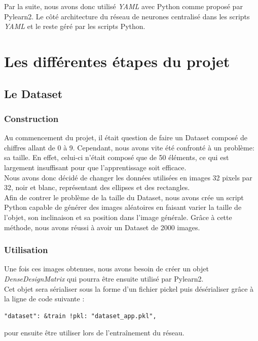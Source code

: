 \documentclass[12pt, a4paper]{article}
\begin{document}
Par la suite, nous avons donc utilisé \emph{YAML} avec Python comme proposé par Pylearn2. Le côté architecture du réseau de neurones centralisé dans les scripts \emph{YAML} et le reste géré par les scripts Python. 

\section{Les différentes étapes du projet}
	\subsection{Le Dataset}
		\subsubsection{Construction}
Au commencement du projet, il était question de faire un Dataset composé de chiffres allant de 0 à 9. 
Cependant, nous avons vite été confronté à un problème: sa taille. En effet, celui-ci n'était composé que de 50 éléments, ce qui est largement insuffisant pour que l'apprentissage soit efficace.
\\

 Nous avons donc décidé de changer les données utilisées en images 32 pixels par 32, noir et blanc, représentant des ellipses et des rectangles.
\\Afin de contrer le problème de la taille du Dataset, nous avons crée un script Python capable de générer des images aléatoires en faisant varier la taille de l'objet, son inclinaison et sa position dans l'image générale. Grâce à cette méthode, nous avons réussi à avoir un Dataset de 2000 images. 
		\subsubsection{Utilisation}
Une fois ces images obtenues, nous avons besoin de créer un objet \emph{DenseDesignMatrix} qui pourra être ensuite utilisé par Pylearn2.\\ Cet objet sera  sérialiser sous la forme d'un fichier pickel puis désérialiser grâce à la ligne de code suivante :
\begin{verbatim}
"dataset": &train !pkl: "dataset_app.pkl",
\end{verbatim}
pour ensuite être utiliser lors de l’entraînement du réseau. 

 
\end{document}

